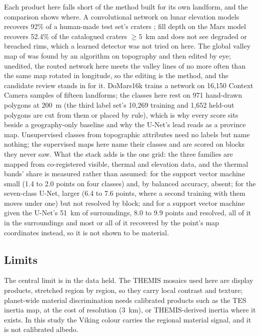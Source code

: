 \documentclass[twocolumn]{aastex701}
\begin{document}
Each product here falls short of the method built for its own landform, and the comparison shows where. A
convolutional network on lunar elevation models recovers 92\% of a human-made test set's craters
\citep{Silburt2019}; fill depth on the Mars model recovers 52.4\% of the catalogued craters $\ge5$~km and does not see
degraded or breached rims, which a learned detector was not tried on here. The global valley map of \citet{Luo2009}
was found by an algorithm on topography and then edited by eye; unedited, the routed network here meets the valley
lines of \citet{Alemanno2018} no more often than the same map rotated in longitude, so the editing is the method, and
the candidate review stands in for it. DoMars16k \citep{Wilhelm2020} trains a network on 16,150 Context Camera samples
of fifteen landforms; the classes here rest on 971 hand-drawn polygons at 200~m (the third label set's 10,269
training and 1,652 held-out polygons are cut from them or placed by rule), which is why every score sits beside a
geography-only baseline and why the U-Net's lead reads as a province map. Unsupervised classes from topographic
attributes \citep{Bue2006} need no labels but name nothing; the supervised maps here name their classes and are scored
on blocks they never saw. What the stack adds is the one grid: the three families are mapped from co-registered
visible, thermal and elevation data, and the thermal bands' share is measured rather than assumed: for the support
vector machine small (1.4 to 2.0 points on four classes) and, by balanced accuracy, absent; for the seven-class U-Net,
larger (6.4 to 7.6 points, where a second training with them moves under one) but not resolved by block; and for a support vector machine given
the U-Net's 51~km of surroundings, 8.0 to 9.9 points and resolved, all of it in the surroundings and most or all
of it recovered by the point's map coordinates instead, so it is not shown to be material.

\subsection{Limits}

The central limit is in the data held. The THEMIS mosaics used here are display products, stretched region by region,
so they carry local contrast and texture; planet-wide material discrimination needs calibrated products such as the
TES inertia map, at the cost of resolution (3~km), or THEMIS-derived inertia \citep{Fergason2006} where it exists. In
this study the Viking colour carries the regional material signal, and it is not calibrated albedo.
\end{document}
